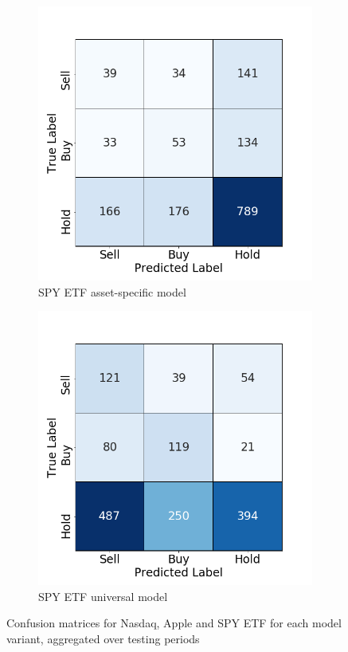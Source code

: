 \documentclass[12pt, a4paper]{article}
\begin{document}
\begin{figure}[H]
\begin{subfigure}{.5\textwidth}
  \centering
  \includegraphics[width=.75\linewidth]{images/CMs/CM_indiv_SPY.png}  
  \caption{SPY ETF asset-specific model}
  \label{fig:subSPYI}
\end{subfigure}
\begin{subfigure}{.5\textwidth}
  \centering
  \includegraphics[width=.75\linewidth]{images/CMs/CM_univ_SPY.png}  
  \caption{SPY ETF universal model}
  \label{fig:subSPYU}
\end{subfigure}

\caption{Confusion matrices for Nasdaq, Apple and SPY ETF for each  model variant, aggregated over testing periods}
\label{fig:AppCMs2}
\end{figure}
\end{document}
